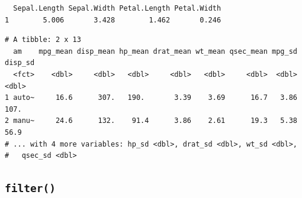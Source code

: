 \documentclass[
  11pt,
]{krantz}
\newenvironment{Shaded}{\begin{snugshade}}{\end{snugshade}}
\newcommand{\CommentTok}[1]{\textcolor[rgb]{0.37,0.37,0.37}{\textit{#1}}}
\newcommand{\DataTypeTok}[1]{\textcolor[rgb]{0.27,0.27,0.27}{#1}}
\newcommand{\DecValTok}[1]{\textcolor[rgb]{0.06,0.06,0.06}{#1}}
\newcommand{\KeywordTok}[1]{\textcolor[rgb]{0.27,0.27,0.27}{\textbf{#1}}}
\newcommand{\NormalTok}[1]{#1}
\newcommand{\OperatorTok}[1]{\textcolor[rgb]{0.43,0.43,0.43}{\textbf{#1}}}
\newcommand{\StringTok}[1]{\textcolor[rgb]{0.5,0.5,0.5}{#1}}
\begin{document}
\begin{verbatim}
  Sepal.Length Sepal.Width Petal.Length Petal.Width
1        5.006       3.428        1.462       0.246
\end{verbatim}

\begin{Shaded}
\end{Shaded}

\begin{verbatim}
# A tibble: 2 x 13
  am    mpg_mean disp_mean hp_mean drat_mean wt_mean qsec_mean mpg_sd disp_sd
  <fct>    <dbl>     <dbl>   <dbl>     <dbl>   <dbl>     <dbl>  <dbl>   <dbl>
1 auto~     16.6      307.   190.       3.39    3.69      16.7   3.86   107. 
2 manu~     24.6      132.    91.4      3.86    2.61      19.3   5.38    56.9
# ... with 4 more variables: hp_sd <dbl>, drat_sd <dbl>, wt_sd <dbl>,
#   qsec_sd <dbl>
\end{verbatim}

\normalsize

\hypertarget{dplyr-filter}{%
\subsection{\texorpdfstring{\texttt{filter()}}{filter()}}\label{dplyr-filter}}
\end{document}

